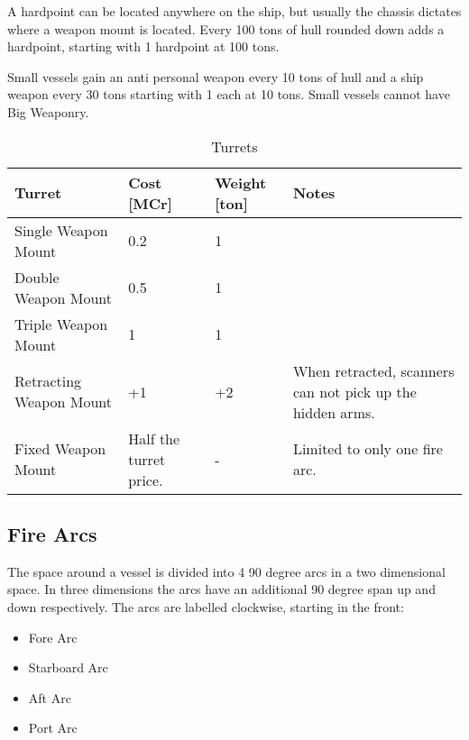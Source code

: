 A hardpoint can be located anywhere on the ship, but usually the chassis dictates where a weapon mount is located. Every 100 tons of hull rounded down adds a hardpoint, starting with 1 hardpoint at 100 tons.

Small vessels gain an anti personal weapon every 10 tons of hull and a ship weapon every 30 tons starting with 1 each at 10 tons. Small vessels cannot have Big Weaponry.

\begin{table}[H]
  \centering
  \caption{Turrets}
  \begin{tabularx}{\textwidth}{|l|X|p{1.2cm}|X|}
    \hline
    Turret                  & Cost [MCr]             & Weight [ton] & Notes                                                     \\ \hline
    Single Weapon Mount     & 0.2                    & 1             & ~                                                         \\ \hline
    Double Weapon Mount     & 0.5                    & 1             & ~                                                         \\ \hline
    Triple Weapon Mount     & 1                      & 1             & ~                                                         \\ \hline
    Retracting Weapon Mount & +1                     & +2            & When retracted, scanners can not pick up the hidden arms. \\ \hline
    Fixed Weapon Mount      & Half the turret price. & -             & Limited to only one fire arc.                             \\ \hline
  \end{tabularx}
\end{table}

\subsection{Fire Arcs}
\label{sub:Fire Arcs}

The space around a vessel is divided into 4 90 degree arcs in a two dimensional space. In three dimensions the arcs have an additional 90 degree span up and down respectively. The arcs are labelled clockwise, starting in the front:

\begin{itemize}
  \item Fore Arc
  \item Starboard Arc
  \item Aft Arc
  \item Port Arc
\end{itemize}

